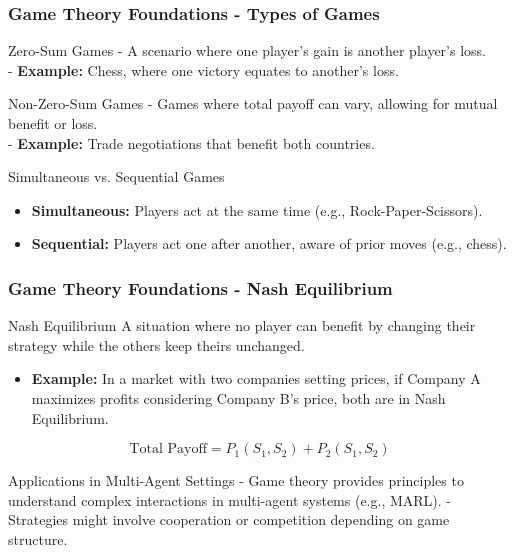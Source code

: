 \documentclass[aspectratio=169]{beamer}
\begin{document}
\begin{frame}[fragile]
  \frametitle{Game Theory Foundations - Types of Games}
  \begin{block}{Zero-Sum Games}
    - A scenario where one player's gain is another player's loss. \\
    - \textbf{Example:} Chess, where one victory equates to another's loss.
  \end{block}

  \begin{block}{Non-Zero-Sum Games}
    - Games where total payoff can vary, allowing for mutual benefit or loss. \\
    - \textbf{Example:} Trade negotiations that benefit both countries.
  \end{block}
  
  \begin{block}{Simultaneous vs. Sequential Games}
    \begin{itemize}
      \item \textbf{Simultaneous:} Players act at the same time (e.g., Rock-Paper-Scissors).
      \item \textbf{Sequential:} Players act one after another, aware of prior moves (e.g., chess).
    \end{itemize}
  \end{block}
\end{frame}

\begin{frame}[fragile]
  \frametitle{Game Theory Foundations - Nash Equilibrium}
  \begin{block}{Nash Equilibrium}
    A situation where no player can benefit by changing their strategy while the others keep theirs unchanged.
  \end{block}

  \begin{itemize}
    \item \textbf{Example:} In a market with two companies setting prices, if Company A maximizes profits considering Company B's price, both are in Nash Equilibrium.
  \end{itemize}

  \begin{equation}
    \text{Total Payoff} = P_1(S_1, S_2) + P_2(S_1, S_2)
  \end{equation}

  \begin{block}{Applications in Multi-Agent Settings}
    - Game theory provides principles to understand complex interactions in multi-agent systems (e.g., MARL).
    - Strategies might involve cooperation or competition depending on game structure.
  \end{block}
\end{frame}
\end{document}

